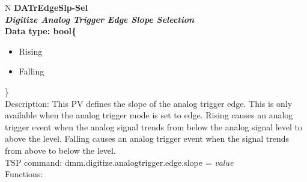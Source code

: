 \documentclass[openany]{article}
\begin{document}
		\begin{tabular}{N}
			\hline
			\bfseries DATrEdgeSlp-Sel\label{pv:datredgeslp-sel} \\ \hline
			\emph{Digitize Analog Trigger Edge Slope Selection} \\
			Data type: bool\{\begin{itemize}[noitemsep]
				\small
				\item[] Rising
				\item[] Falling
			\end{itemize}\} \\
			Description: This PV defines the slope of the analog trigger edge. This is only available when the analog trigger mode is set to edge. Rising causes an analog trigger event when the analog signal trends from below the analog signal level to above the level. Falling causes an analog trigger event when the signal trends from above to below the level. \\
			TSP command: dmm.digitize.analogtrigger.edge.slope = \emph{value} \\
			Functions: \\
			\arrayrulecolor{\FuncTableBorderColor}

		\end{tabular}
\end{document}
